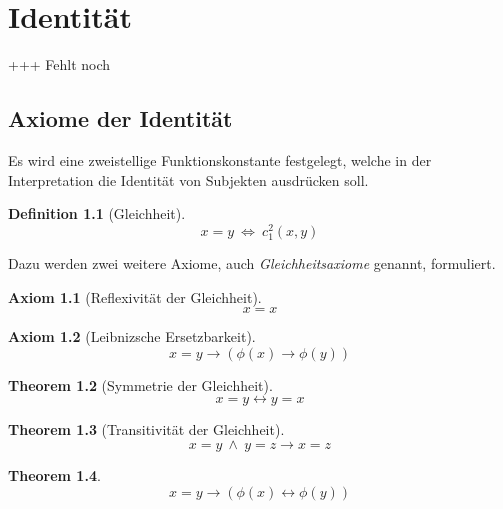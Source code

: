 \documentclass[a4paper,german,10pt,twoside]{book}
\newtheorem{thm}{Theorem}[chapter]
\newtheorem{ax}{Axiom}
\theoremstyle{definition}
\newtheorem{defn}[thm]{Definition}
\theoremstyle{remark}
\begin{document}

\chapter{Identit{\"a}t} \label{chapter6} \hypertarget{chapter6}{}

+++ Fehlt noch

\section{Axiome der Identit{\"a}t} \label{chapter6_section0} \hypertarget{chapter6_section0}{}
\hypertarget{gleichheit}{}
Es wird eine zweistellige Funktionskonstante festgelegt, welche in der Interpretation die Identit{\"a}t
von Subjekten ausdr{\"u}cken soll.
\begin{defn}[Gleichheit]
$$x = y \ \Leftrightarrow \ c_1^2(x, y)$$
\end{defn}

Dazu werden zwei weitere Axiome, auch
\emph{Gleichheitsaxiome} genannt, formuliert.
\begin{ax}[Reflexivit{\"a}t der Gleichheit]
$$x = x$$
\end{ax}

\begin{ax}[Leibnizsche Ersetzbarkeit]\hypertarget{leibniz}{}
$$x = y  \rightarrow (\phi(x) \rightarrow \phi(y))$$
\end{ax}

\begin{thm}[Symmetrie der Gleichheit]
\begin{equation}
x = y \leftrightarrow y = x
\end{equation}
\end{thm}

\begin{thm}[Transitivit{\"a}t der Gleichheit]
\begin{equation}
x = y ~ \land ~ y = z \rightarrow x = z
\end{equation}
\end{thm}

\begin{thm}
\begin{equation}
x = y \rightarrow (\phi(x) \leftrightarrow \phi(y))
\end{equation}
\end{thm}
\end{document}
